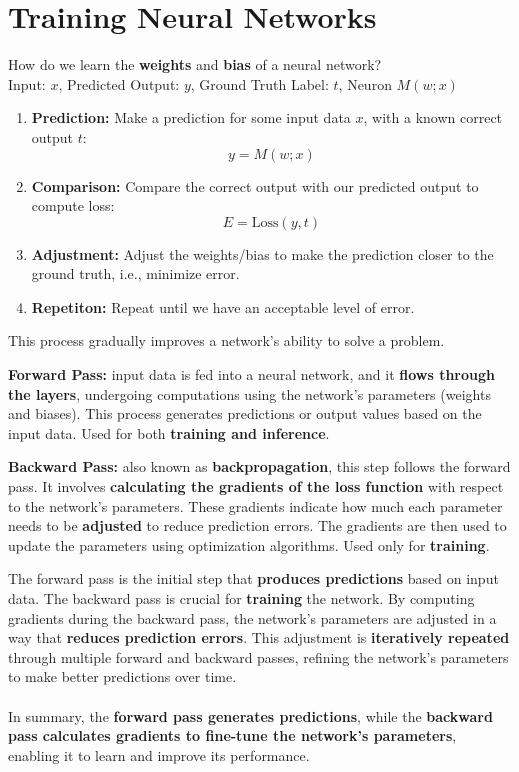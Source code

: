 \section{Training Neural Networks}

How do we learn the\textbf{ weights} and\textbf{ bias }of a neural network?\\
Input: \( x \), Predicted Output: \( y \), Ground Truth Label: \( t \), Neuron \( M(w;x) \)
\begin{enumerate}
  \item \textbf{Prediction:} Make a prediction for some input data \( x \), with a known correct output \( t \):
  \[ y = M(w;x) \]
  
  \item \textbf{Comparison:} Compare the correct output with our predicted output to compute loss:
  \[ E = \text{Loss}(y, t) \]
  
  \item \textbf{Adjustment:} Adjust the weights/bias to make the prediction closer to the ground truth, i.e., minimize error.
  \item \textbf{Repetiton:} Repeat until we have an acceptable level of error.

\end{enumerate}
This process gradually improves a network's ability to solve a problem.

\begin{definition}
    \textbf{Forward Pass:} input data is fed into a neural network, and it \textbf{flows through the layers}, undergoing computations using the network's parameters (weights and biases). This process generates predictions or output values based on the input data. Used for both \textbf{training and inference}.
\end{definition}

\begin{definition}
    \textbf{Backward Pass:} also known as \textbf{backpropagation}, this step follows the forward pass. It involves \textbf{calculating the gradients of the loss function} with respect to the network's parameters. These gradients indicate how much each parameter needs to be \textbf{adjusted} to reduce prediction errors. The gradients are then used to update the parameters using optimization algorithms. Used only for \textbf{training}.
\end{definition}

The forward pass is the initial step that \textbf{produces predictions} based on input data. The backward pass is crucial for \textbf{training} the network. By computing gradients during the backward pass, the network's parameters are adjusted in a way that \textbf{reduces prediction errors}. This adjustment is \textbf{iteratively repeated} through multiple forward and backward passes, refining the network's parameters to make better predictions over time.\\
\\In summary, the \textbf{forward pass generates predictions}, while the \textbf{backward pass calculates gradients to fine-tune the network's parameters}, enabling it to learn and improve its performance.

